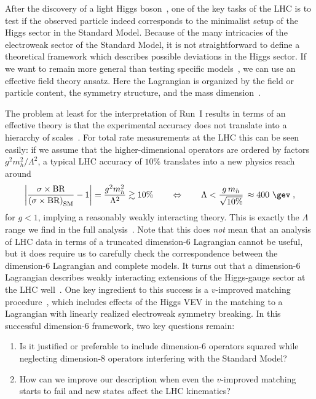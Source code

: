 
After the discovery of a light Higgs boson~\cite{higgs,discovery}, one
of the key tasks of the LHC is to test if the observed particle indeed
corresponds to the minimalist setup of the Higgs sector in the
Standard Model. Because of the many intricacies of the electroweak
sector of the Standard Model, it is not straightforward to define a
theoretical framework which describes possible deviations in the Higgs
sector. If we want to remain more general than testing specific
models~\cite{bsmreview}, we can use an effective field theory ansatz.
Here the Lagrangian is organized by the field or particle content, the
symmetry structure, and the mass
dimension~\cite{eftfoundations,eftorig,higgsreview}.

The problem at least for the interpretation of Run~I results in terms
of an effective theory is that the experimental accuracy does not
translate into a hierarchy of scales~\cite{legacy,heft_limitations}.
For total rate measurements at the LHC this can be seen easily: if we
assume that the higher-dimensional operators are ordered by factors
$g^2 m_h^2/\Lambda^2$, a typical LHC accuracy of $10\%$ translates
into a new physics reach around
%
\begin{align}
\left| \frac{\sigma \times \text{BR}}{\left( \sigma \times \text{BR} \right)_\text{SM}} - 1 \right|
= \frac{g^2 m_h^2}{\Lambda^2} \gtrsim 10\%
\qquad \Leftrightarrow \qquad 
\Lambda < \frac{g \, m_h}{\sqrt{10\%} } \, \approx 400~\gev \; ,
\label{eq:lmax}
\end{align}
%
for $g <1$, implying a reasonably weakly interacting theory. This is
exactly the $\Lambda$ range we find in the full
analysis~\cite{legacy}.  Note that this does \emph{not} mean that an
analysis of LHC data in terms of a truncated dimension-6 Lagrangian
cannot be useful, but it does require us to carefully check the
correspondence between the dimension-6 Lagrangian and complete
models. It turns out that a dimension-6 Lagrangian describes weakly
interacting extensions of the Higgs-gauge sector at the LHC
well~\cite{too_long}.  One key ingredient to this success is a
$v$-improved matching procedure~\cite{too_long}, which includes
effects of the Higgs VEV in the matching to a Lagrangian with linearly
realized electroweak symmetry breaking.  In this successful
dimension-6 framework, two key questions remain:
%
\begin{enumerate}
\item Is it justified or preferable to include dimension-6 operators
  squared while neglecting dimension-8 operators interfering with the
  Standard Model?
\item How can we improve our description when even the $v$-improved
  matching starts to fail and new states affect the LHC kinematics?
\end{enumerate}
% 
\bigskip

